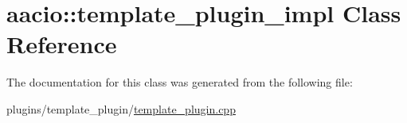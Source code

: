 \hypertarget{classaacio_1_1template__plugin__impl}{}\section{aacio\+:\+:template\+\_\+plugin\+\_\+impl Class Reference}
\label{classaacio_1_1template__plugin__impl}


The documentation for this class was generated from the following file\+:\begin{DoxyCompactItemize}
\item 
plugins/template\+\_\+plugin/\mbox{\hyperlink{template__plugin_8cpp}{template\+\_\+plugin.\+cpp}}\end{DoxyCompactItemize}
